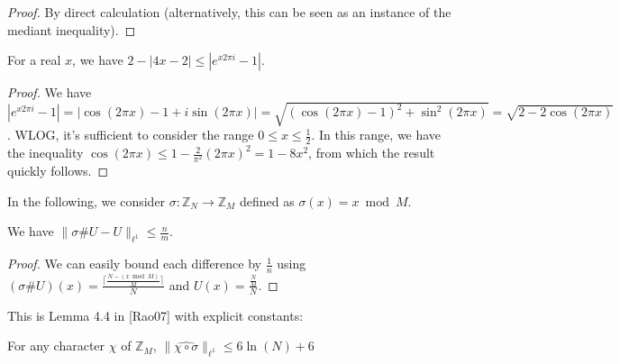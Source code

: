 \begin{proof}
    \leanok
    By direct calculation (alternatively, this can be seen as an instance of the mediant inequality).
\end{proof}

\begin{lemma}
    \label{circle_lower_bound}
    \leanok
    For a real $x$, we have $2 - |4x - 2| \leq |e^{x 2\pi i} - 1|$.
\end{lemma}

\begin{proof}
    \leanok
    We have $|e^{x 2\pi i} - 1| = |\cos(2 \pi x) - 1 + i \sin(2 \pi x)| =
    \sqrt{(\cos(2 \pi x) - 1)^2 + \sin^2(2 \pi x)} = \sqrt{2 - 2\cos(2\pi x)}$.
    WLOG, it's sufficient to consider the range $0 \leq x \leq \frac12$.
    In this range, we have the inequality $\cos(2 \pi x) \leq 1 - \frac{2}{\pi^2} (2 \pi x)^2 = 1 - 8 x^2$,
    from which the result quickly follows.
\end{proof}

In the following, we consider $\sigma: \mathbb{Z}_N \to \mathbb{Z}_M$ defined as $\sigma(x) = x \bmod M$.

\begin{lemma}
    \label{bound_on_apply_uniform}
    \leanok
    We have $\lVert \sigma \# U - U \rVert_{\ell^1} \leq \frac nm$.
\end{lemma}

\begin{proof}
    \leanok
    We can easily bound each difference by $\frac1n$ using $(\sigma \# U)(x) = \frac{\lceil \frac{N - (x \bmod M)}{M} \rceil}N$ and $U(x) = \frac{\frac NM}N$.
\end{proof}

\begin{theorem}
    \label{lemma44}
    \leanok
    This is Lemma 4.4 in [Rao07] with explicit constants:

    For any character $\chi$ of $\mathbb{Z}_M$, $\lVert \widehat{\chi \circ \sigma}\rVert_{\ell^1} \leq 6 \ln(N) + 6$
\end{theorem}

